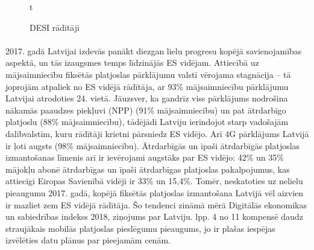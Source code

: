 \begin{figure}[ht]
    \label{att:desi_savienojamiba}t
    \caption{DESI rādītāji}
\end{figure}
\paragraph{}
2017. gadā Latvijai izdevās panākt diezgan lielu progresu kopējā savienojamības
aspektā, un tās izaugsmes temps līdzinājās ES vidējam. Attiecībā uz mājsaimniecību
fiksētās platjoslas pārklājumu valstī vērojama stagnācija – tā joprojām atpaliek no ES
vidējā rādītāja, ar 93\% mājsaimniecību pārklājumu Latvijai atrodoties 24. vietā.
Jāuzsver, ka gandrīz viss pārklājums nodrošina nākamās paaudzes piekļuvi (NPP)
(91\% mājsaimniecību) un pat ātrdarbīgo platjoslu (88\% mājsaimniecību), tādējādi
Latviju ierindojot starp vadošajām dalībvalstīm, kuru rādītāji krietni pārsniedz ES
vidējo. Arī 4G pārklājums Latvijā ir ļoti augsts (98\% mājsaimniecību). Ātrdarbīgās un
īpaši ātrdarbīgās platjoslas izmantošanas līmenis arī ir ievērojami augstāks par ES
vidējo: 42\% un 35\% mājokļu abonē ātrdarbīgas un īpaši ātrdarbīgas platjoslas
pakalpojumus, kas attiecīgi Eiropas Savienībā vidēji ir 33\% un 15,4\%. Tomēr,
neskatoties uz nelielu pieaugumu 2017. gadā, kopējā fiksētās platjoslas izmantošana
Latvijā vēl aizvien ir mazliet zem ES vidējā rādītāja. Šo tendenci zināmā mērā 
Digitālās ekonomikas un sabiedrības indekss 2018, ziņojums par Latviju. lpp. 4 no 11
kompensē daudz straujākais mobilās platjoslas pieslēgumu pieaugums, jo ir plašas
iespējas izvēlēties datu plānus par pieejamām cenām.
